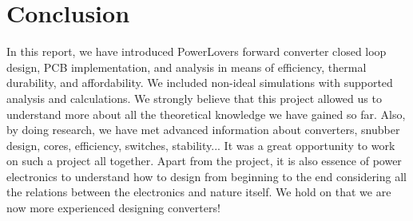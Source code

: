 \section{Conclusion}

In this report, we have introduced PowerLovers forward converter closed loop design, PCB implementation, and analysis in means of efficiency, thermal durability, and affordability. We included non-ideal simulations with supported analysis and calculations. We strongly believe that this project allowed us to understand more about all the theoretical knowledge we have gained so far. Also, by doing research, we have met advanced information about converters, snubber design, cores, efficiency, switches, stability... It was a great opportunity to work on such a project all together. Apart from the project, it is also essence of power electronics to understand how to design from beginning to the end considering all the relations between the electronics and nature itself. We hold on that we are now more experienced designing converters!